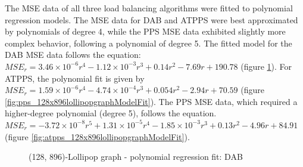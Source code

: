 The MSE data of all three load balancing algorithms were fitted to polynomial regression models. The MSE data for DAB and ATPPS were best approximated by polynomials of degree 4, while the PPS MSE data exhibited slightly more complex behavior, following a polynomial of degree 5. The fitted model for the DAB MSE data follows the equation: $MSE_r=3.46\times 10^{-6}r^{4}-1.12\times 10^{-3}r^{3}+0.14r^{2}-7.69r+190.78$ (figure \ref{fig:dab_128x896lollipopgraphModelFit}). For ATPPS, the polynomial fit is given by $MSE_r=1.59\times 10^{-6}r^{4}-4.74\times 10^{-4}r^{3}+0.054r^{2}-2.94r+70.59$ (figure \ref{fig:pps_128x896lollipopgraphModelFit}). The PPS MSE data, which required a higher-degree polynomial (degree 5), follows the equation. $MSE_r=-3.72\times10^{-8}r^{5}+1.31\times 10^{-5}r^{4}-1.85\times 10^{-3}r^{3}+0.13r^{2}-4.96r+84.91$ (figure \ref{fig:atpps_128x896lollipopgraphModelFit}).

\begin{figure}[]
    \centering
    \caption{(128, 896)-Lollipop graph - polynomial regression fit: DAB}
    \label{fig:dab_128x896lollipopgraphModelFit}
\end{figure}

